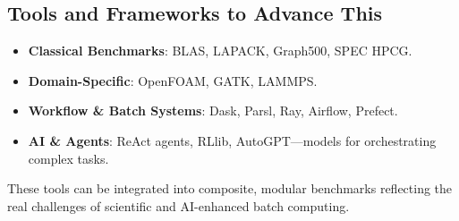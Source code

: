 \subsection{\textbf{Tools and Frameworks to Advance This}}

\begin{itemize}
    \item \textbf{Classical Benchmarks}: BLAS, LAPACK, Graph500, SPEC HPCG.
    \item \textbf{Domain-Specific}: OpenFOAM, GATK, LAMMPS.
    \item \textbf{Workflow \& Batch Systems}: Dask, Parsl, Ray, Airflow, Prefect.
    \item \textbf{AI \& Agents}: ReAct agents, RLlib, AutoGPT—models for orchestrating complex tasks.
\end{itemize}
These tools can be integrated into composite, modular benchmarks reflecting the real challenges of scientific and AI-enhanced batch computing.

  